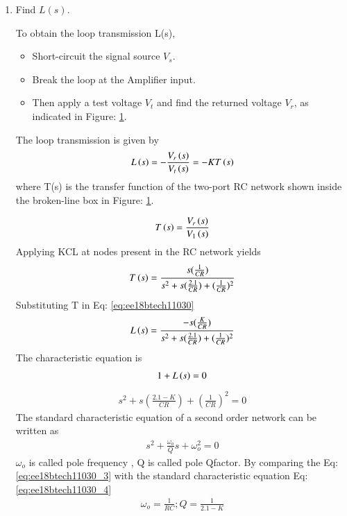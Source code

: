 \begin{enumerate}[label=\arabic*.,ref=\theenumi]
\item Find $L(s)$.

\solution To obtain the loop transmission L(s),
\begin{itemize}
\item Short-circuit the signal source $V_s$.
\item Break the loop at the Amplifier input.
\item Then apply a test voltage $V_t$ and find the returned voltage $V_r$, as indicated in Figure: \ref{fig:ee18btech11030_fig1}.
\end{itemize}

\begin{figure}[!ht]
	\begin{center}
		\resizebox{\columnwidth/1}{!}{}
	\end{center}
	\caption{}
	\label{fig:ee18btech11030_fig1}
\end{figure}

The loop transmission is given by
\begin{align}
    L\brak{s} = -\frac{V_r\brak{s}}{V_t\brak{s}} = -KT\brak{s}
\label{eq:ee18btech11030}
\end{align}
where T(s) is the transfer function of the two-port RC network shown inside the broken-line box in Figure: \ref{fig:ee18btech11030_fig1}.

\begin{align}
T\brak{s} = \frac{V_r\brak{s}}{V_1\brak{s}}
\label{eq:ee18btech11030_1}
\end{align}
Applying KCL at nodes present in the RC network yields  
\begin{align}
T\brak{s} = \frac{s(\frac{1}{CR})}{s^2 + s(\frac{2.1}{CR}) + (\frac{1}{CR})^2}
\label{eq:ee18btech11030_2}
\end{align}
Substituting T in Eq: \ref{eq:ee18btech11030}
\begin{align}
    L\left(s\right) = \frac{-s(\frac{K}{CR})}{s^2 + s(\frac{2.1}{CR}) + (\frac{1}{CR})^2}
\end{align}
The characteristic equation is 
\begin{align}
    1+L\left(s\right)=0  
\end{align}
\begin{align}
s^2 + s(\frac{2.1-K}{CR}) + (\frac{1}{CR})^2 = 0
\label{eq:ee18btech11030_3}
\end{align}
The standard characteristic equation of a second order network can be written as 
\begin{align}
    s^2 + \frac{\omega_o}{Q}s + \omega_o^2 = 0
    \label{eq:ee18btech11030_4}
\end{align}
$\omega_o$ is called pole frequency , Q is called pole Qfactor. 
By comparing the Eq:\ref{eq:ee18btech11030_3} with the standard characteristic equation Eq:\ref{eq:ee18btech11030_4}
\begin{align}
   \omega_o = \frac{1}{RC} ; Q = \frac{1}{2.1-K}
\end{align}


\end{enumerate}
